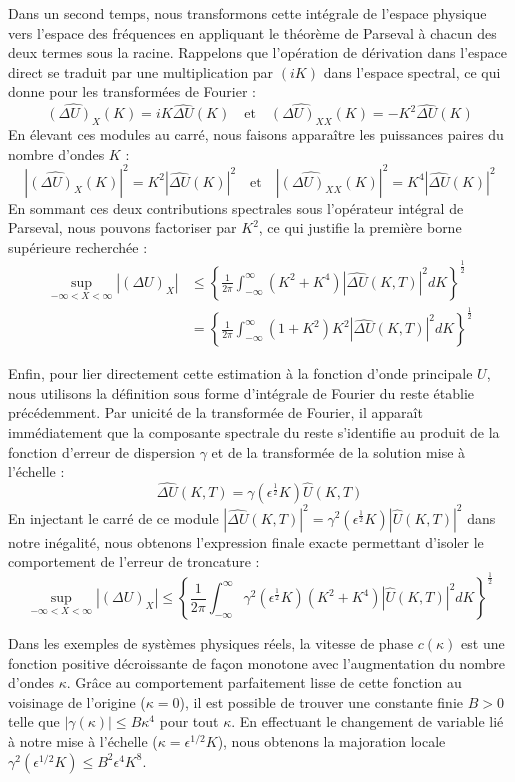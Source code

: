Dans un second temps, nous transformons cette intégrale de l'espace physique vers l'espace des fréquences en appliquant le théorème de Parseval à chacun des deux termes sous la racine. Rappelons que l'opération de dérivation dans l'espace direct se traduit par une multiplication par $(iK)$ dans l'espace spectral, ce qui donne pour les transformées de Fourier :
\[
\widehat{(\Delta U)_X}(K) = iK \widehat{\Delta U}(K) \quad \text{et} \quad \widehat{(\Delta U)_{XX}}(K) = -K^2 \widehat{\Delta U}(K)
\]
En élevant ces modules au carré, nous faisons apparaître les puissances paires du nombre d'ondes $K$ :
\[
|\widehat{(\Delta U)_X}(K)|^2 = K^2 |\widehat{\Delta U}(K)|^2 \quad \text{et} \quad |\widehat{(\Delta U)_{XX}}(K)|^2 = K^4 |\widehat{\Delta U}(K)|^2
\]
En sommant ces deux contributions spectrales sous l'opérateur intégral de Parseval, nous pouvons factoriser par $K^2$, ce qui justifie la première borne supérieure recherchée :
\begin{align*}
\sup_{-\infty<X<\infty}|(\Delta U)_{X}| &\le \left\{\frac{1}{2\pi}\int_{-\infty}^{\infty}(K^2+K^4)|\hat{\Delta U}(K,T)|^{2}dK\right\}^{\frac{1}{2}} \\
&= \left\{\frac{1}{2\pi}\int_{-\infty}^{\infty}(1+K^{2})K^{2}|\hat{\Delta U}(K,T)|^{2}dK\right\}^{\frac{1}{2}}
\end{align*}

Enfin, pour lier directement cette estimation à la fonction d'onde principale $U$, nous utilisons la définition sous forme d'intégrale de Fourier du reste établie précédemment. Par unicité de la transformée de Fourier, il apparaît immédiatement que la composante spectrale du reste s'identifie au produit de la fonction d'erreur de dispersion $\gamma$ et de la transformée de la solution mise à l'échelle :
\[
\widehat{\Delta U}(K,T) = \gamma(\epsilon^{\frac{1}{2}}K)\hat{U}(K,T)
\]
En injectant le carré de ce module $|\widehat{\Delta U}(K,T)|^2 = \gamma^2(\epsilon^{\frac{1}{2}}K)|\hat{U}(K,T)|^2$ dans notre inégalité, nous obtenons l'expression finale exacte permettant d'isoler le comportement de l'erreur de troncature :
\begin{equation}
\sup_{-\infty<X<\infty}|(\Delta U)_{X}| \le \left\{\frac{1}{2\pi}\int_{-\infty}^{\infty}\gamma^{2}(\epsilon^{\frac{1}{2}}K)(K^{2}+K^{4})|\hat{U}(K,T)|^{2}dK\right\}^{\frac{1}{2}}
\end{equation}



Dans les exemples de systèmes physiques réels, la vitesse de phase $c(\kappa)$ est une fonction positive décroissante de façon monotone avec l'augmentation du nombre d'ondes $\kappa$. Grâce au comportement parfaitement lisse de cette fonction au voisinage de l'origine ($\kappa = 0$), il est possible de trouver une constante finie $B > 0$ telle que $|\gamma(\kappa)| \le B\kappa^{4}$ pour tout $\kappa$. En effectuant le changement de variable lié à notre mise à l'échelle ($\kappa = \epsilon^{1/2}K$), nous obtenons la majoration locale $\gamma^2(\epsilon^{1/2}K) \le B^2 \epsilon^4 K^8$.

